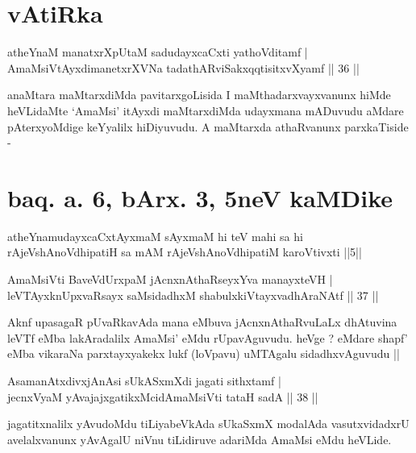\section*{vAtiRka}

\begin{shl}
atheYnaM manatxrXpUtaM sadudayxcaCxti yathoVditamf | \\
AmaMsiVtAyxdimanetxrXVNa tadathARviSakxqqtisitxvXyamf \hfill|| 36 || 
\end{shl}

\begin{artha}
anaMtara maMtarxdiMda pavitarxgoLisida I maMthadarxvayxvanunx hiMde heVLidaMte `AmaMsi' itAyxdi maMtarxdiMda udayxmana mADuvudu aMdare pAterxyoMdige keYyalilx hiDiyuvudu. A maMtarxda athaRvanunx parxkaTiside - 
\end{artha}

\section{baq. a. 6, bArx. 3, 5neV kaMDike}

\begin{shl}
atheYnamudayxcaCxtAyxmaM sAyxmaM hi teV mahi sa hi rAjeVshAnoV\s dhipatiH sa mAM rAjeVshAnoV\s dhipatiM karoVtivxti ||5||
\end{shl}

\begin{shl}
AmaMsiVti BaveVdUrxpaM jAcnxnAthaRseyxYva manayxteVH | \\
leVTAyxknUpxvaRsayx saMsidadhxM shabulxkiVtayxvadhAraNAtf \hfill|| 37 || 
\end{shl}

\begin{artha}
Aknf upasagaR pUvaRkavAda mana eMbuva jAcnxnAthaRvuLaLx dhAtuvina leVTf eMba lakAradalilx AmaMsi' eMdu rUpavAguvudu. heVge ? eMdare shapf' eMba vikaraNa parxtayxyakekx lukf (loVpavu) uMTAgalu sidadhxvAguvudu ||
\end{artha}


\begin{shl}
AsamanAtxdivxjAnAsi sUkASxmXdi jagati sithxtamf | \\
jecnxVyaM yAvajajxgatikxMcidAmaMsiVti tataH sadA \hfill|| 38 || 
\end{shl}

\begin{artha}
jagatitxnalilx yAvudoMdu tiLiyabeVkAda sUkaSxmX modalAda vasutxvidadxrU avelalxvanunx yAvAgalU niVnu tiLidiruve adariMda AmaMsi eMdu heVLide.
\end{artha}

